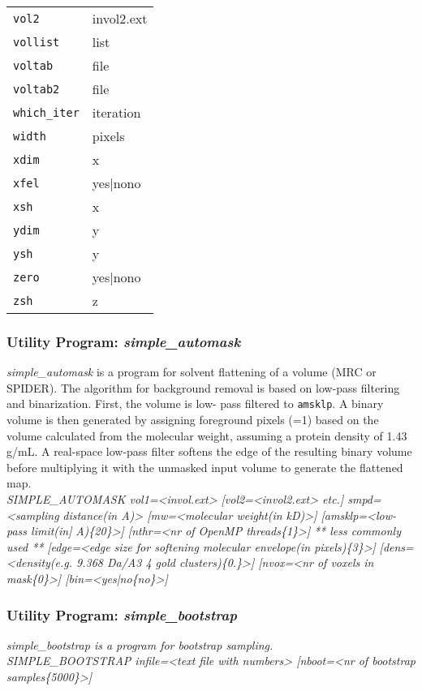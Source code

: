 \documentclass[review]{elsarticle}
\begin{document}
\begin{tabular}{ll}
\texttt{vol2}&{invol2.ext}\\
\texttt{vollist}&{list}\\
\texttt{voltab}&{file}\\
\texttt{voltab2}&{file}\\
\texttt{which\_iter}&{iteration}\\
\texttt{width}&{pixels}\\
\texttt{xdim}&{x}\\
\texttt{xfel}&{yes|no{no}}\\
\texttt{xsh}&{x}\\
\texttt{ydim}&{y}\\
\texttt{ysh}&{y}\\
\texttt{zero}&{yes|no{no}}\\
\texttt{zsh}&{z}\\
\end{tabular}

\subsubsection{Utility Program: {\it{simple\_automask}}}
\label{automask}
{\it{simple\_automask}} is a program for solvent flattening of a volume (MRC or SPIDER). The algorithm for background removal is based on low-pass filtering and binarization. First, the volume is low- pass filtered to \texttt{amsklp}. A binary volume is then generated by assigning foreground pixels (=1) based on the volume calculated from the molecular weight, assuming a protein density of 1.43 g/mL. A real-space low-pass filter softens the edge of the resulting binary volume before multiplying it with the unmasked input volume to generate the flattened map.\\
{\it{SIMPLE\_AUTOMASK vol1=<invol.ext> [vol2=<invol2.ext> etc.] smpd=<sampling}}
{\it{distance(in A)> [mw=<molecular weight(in kD)>] [amsklp=<low-pass limit(in}]}
{\it{A)\{20\}>] [nthr=<nr of OpenMP threads\{1\}>]}}
{\it{** less commonly used **}}
{\it{[edge=<edge size for softening molecular envelope(in pixels)\{3\}>]}}
{\it{[dens=<density(e.g. 9.368 Da/A3 4 gold clusters)\{0.\}>] [nvox=<nr of voxels in}}
{\it{mask\{0\}>] [bin=<yes|no\{no\}>]}}

\subsubsection{Utility Program: {\it{simple\_bootstrap}}}
\label{bootstrap}
{\it{simple\_bootstrap} is a program for bootstrap sampling.}\\
{\it{SIMPLE\_BOOTSTRAP infile=<text file with numbers> [nboot=<nr of bootstrap}}
{\it{samples\{5000\}>]}}
\end{document}
